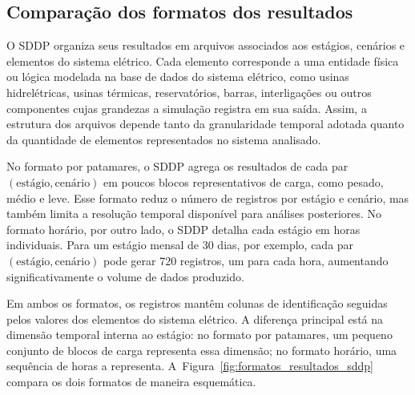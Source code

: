 \subsection{Comparação dos formatos dos resultados}
\label{sec:formato_resultados_sddp}

O SDDP organiza seus resultados em arquivos associados aos estágios,
cenários e elementos do sistema elétrico. Cada elemento corresponde a
uma entidade física ou lógica modelada na base de dados do sistema elétrico,
como usinas hidrelétricas, usinas térmicas, reservatórios, barras,
interligações ou outros componentes cujas grandezas a simulação registra em sua
saída. Assim, a estrutura dos arquivos depende tanto da granularidade
temporal adotada quanto da quantidade de elementos representados no sistema
analisado.

No formato por patamares, o SDDP agrega os resultados de cada par
$(\text{estágio}, \text{cenário})$ em poucos blocos
representativos de carga, como pesado, médio e leve. Esse formato reduz o
número de registros por estágio e cenário, mas também limita a resolução
temporal disponível para análises posteriores. No formato horário, por outro
lado, o SDDP detalha cada estágio em horas individuais. Para um estágio mensal de
30 dias, por exemplo, cada par $(\text{estágio}, \text{cenário})$ pode gerar
720 registros, um para cada hora, aumentando significativamente o volume de
dados produzido.

Em ambos os formatos, os registros mantêm colunas de identificação seguidas
pelos valores dos elementos do sistema elétrico. A diferença principal está na
dimensão temporal interna ao estágio: no formato por patamares, um
pequeno conjunto de blocos de carga representa essa dimensão; no formato
horário, uma sequência de horas a representa. A~Figura~\ref{fig:formatos_resultados_sddp}
compara os dois formatos de maneira esquemática.

